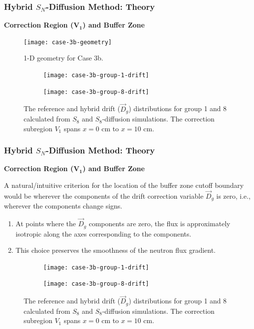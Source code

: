 \begin{frame}
  \frametitle{Hybrid $S_N$-Diffusion Method: Theory}
  \textbf{Correction Region ($\bm{V_1}$) and Buffer Zone}
  \begin{figure}[htb!]
    \centering
    \texttt{[image: case-3b-geometry]}
    \caption{1-D geometry for Case 3b.}
    \label{fig:3b-geometry}
  \end{figure}
  \begin{figure}[htb!]
      \centering
      \begin{subfigure}[t]{.49\textwidth}
          \centering
          \texttt{[image: case-3b-group-1-drift]}
      \end{subfigure}
      \hfill
      \begin{subfigure}[t]{.49\textwidth}
          \centering
          \texttt{[image: case-3b-group-8-drift]}
      \end{subfigure}
      \caption{The reference and hybrid drift ($\vec{D}_g$) distributions for group 1 and 8 calculated
        from $S_8$ and $S_8$-diffusion simulations. The correction subregion $V_1$ spans $x=0$ cm to
        $x=10$ cm.}
      \label{fig:3b-drift-1}
  \end{figure}
\end{frame}

\begin{frame}
  \frametitle{Hybrid $S_N$-Diffusion Method: Theory}
  \textbf{Correction Region ($\bm{V_1}$) and Buffer Zone}
  \vspace{.2cm}

  A natural/intuitive criterion for the location of the buffer zone cutoff boundary
  would be wherever the components of the drift correction variable $\vec{D}_g$ is zero, i.e.,
  wherever the components change signs.
  \begin{enumerate}
    \item At points where the $\vec{D}_g$ components are zero, the flux is approximately isotropic
      along the axes corresponding to the components.
    \item This choice preserves the smoothness of the neutron flux gradient.
  \end{enumerate}
  \begin{figure}[htb!]
      \centering
      \begin{subfigure}[t]{.49\textwidth}
          \centering
          \texttt{[image: case-3b-group-1-drift]}
      \end{subfigure}
      \hfill
      \begin{subfigure}[t]{.49\textwidth}
          \centering
          \texttt{[image: case-3b-group-8-drift]}
      \end{subfigure}
      \caption{The reference and hybrid drift ($\vec{D}_g$) distributions for group 1 and 8 calculated
        from $S_8$ and $S_8$-diffusion simulations. The correction subregion $V_1$ spans $x=0$ cm to
        $x=10$ cm.}
      \label{fig:3b-drift-1}
  \end{figure}
\end{frame}

